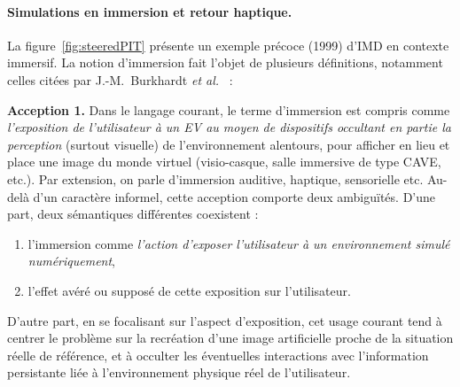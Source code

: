 	\paragraph{Simulations en immersion et retour haptique.}
	La figure~\ref{fig:steeredPIT} présente un exemple précoce (1999) d'IMD en contexte immersif. La notion d'immersion fait l'objet de plusieurs définitions, notamment celles citées par J.-M.~Burkhardt \emph{et al.}~\cite{burkhardt2003immersion} :
	
	\begin{displayquote}
	    \textbf{Acception 1.} Dans le langage courant, le terme d'immersion est compris comme \emph{l'exposition de l'utilisateur à un EV au moyen de dispositifs occultant en partie la perception} (surtout visuelle) de l'environnement alentours, pour afficher en lieu et place une image du monde virtuel (visio-casque, salle immersive de type CAVE, etc.). Par extension, on parle d'immersion auditive, haptique, sensorielle etc. Au-delà d'un caractère informel, cette acception comporte deux ambiguïtés. D'une part, deux sémantiques différentes coexistent :
	    \renewcommand{\labelenumi}{\alph{enumi}} %
	    \begin{enumerate}
	        \item l'immersion comme \emph{l'action d'exposer l'utilisateur à un environnement simulé numériquement},
	        \item l'effet avéré ou supposé de cette exposition sur l'utilisateur.
	    \end{enumerate}
	    
	    D'autre part, en se focalisant sur l'aspect d'exposition, cet usage courant tend à centrer le problème sur la recréation d'une image artificielle proche de la situation réelle de référence, et à occulter les éventuelles interactions avec l'information persistante liée à l'environnement physique réel de l'utilisateur.
	    

\end{displayquote}
